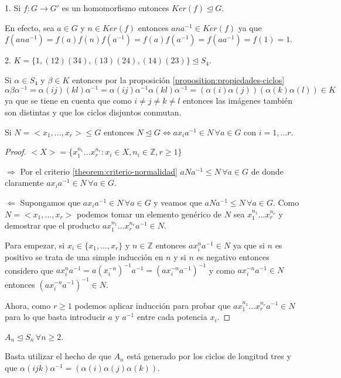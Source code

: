 \begin{example}
1. Si $f:G \rightarrow G'$ es un homomorfismo entonces $Ker(f) \trianglelefteq G$.

En efecto, sea $a \in G$ y $n \in Ker(f)$ entonces $ana^{-1} \in Ker(f)$ ya que $f(ana^{-1}) = f(a)f(n)f(a^{-1}) = f(a)f(a^{-1}) = f(aa^{-1}) = f(1) = 1$.

2. $K = \{1,(12)(34),(13)(24),(14)(23)\} \trianglelefteq S_4$.

Si $\alpha \in S_4$ y $\beta \in K$ entonces por la proposición \ref{proposition:propiedades-ciclos} $\alpha \beta  \alpha^{-1} = \alpha (ij)(kl) \alpha^{-1} =\alpha (ij) \alpha^{-1} \alpha (kl) \alpha^{-1} = (\alpha(i) \alpha(j))(\alpha(k) \alpha(l)) \in K$ ya que se tiene en cuenta que como  $i \neq j \neq k \neq l$ entonces las imágenes también son distintas y que los ciclos disjuntos conmutan.
\end{example}

\begin{proposition}
Si $N = <x_1,...,x_r>  \le G$ entonces $N \unlhd G \iff ax_ia^{-1} \in N \, \forall a \in G$ con $i = 1,...r$.
\end{proposition}
\begin{proof}
$<X> = \{x_1^{n_1}...x_r^{n_r}:x_i \in X,n_i \in \mathbb{Z},r \ge 1\}$

$\Rightarrow$ Por el criterio \ref{theorem:criterio-normalidad} $aNa^{-1} \le N \, \forall a \in G$ de donde claramente $ax_ia^{-1} \in N \, \forall a \in G$.

$\Leftarrow$ Supongamos que $ax_ia^{-1} \in N \, \forall a \in G$ y veamos que $aNa^{-1} \le N \, \forall a \in G$. Como $N = <x_1,...,x_r>$ podemos tomar un elemento genérico de $N$ sea $x_1^{n_1}...x_r^{n_r}$ y demostrar que el producto $ax_1^{n_1}...x_r^{n_r}a^{-1} \in N$.

Para empezar, si $x_i \in \{x_1,...,x_r\}$ y $n \in \mathbb{Z}$ entonces $ax_i^na^{-1} \in N$ ya que si $n$ es positivo se trata de una simple inducción en $n$ y si $n$ es negativo entonces considero que $ax_i^na^{-1} = a(x_i^{-n})^{-1}a^{-1} = (ax_i^{-n}a^{-1})^{-1}$ y como $ax_i^{-n}a^{-1} \in N$ entonces $(ax_i^{-n}a^{-1})^{-1} \in N$.

Ahora, como $r \ge 1$ podemos aplicar inducción para probar que $ax_1^{n_1}...x_r^{n_r}a^{-1} \in N$ para lo que basta introducir $a$ y $a^{-1}$ entre cada potencia $x_i$.
\end{proof}

\begin{example}
$A_n \trianglelefteq S_n \, \forall n \geq 2$.

Basta utilizar el hecho de que $A_n$ está generado por los ciclos de longitud tres y que $\alpha (ijk) \alpha^{-1} = (\alpha(i)\alpha(j)\alpha(k))$.
\end{example}

